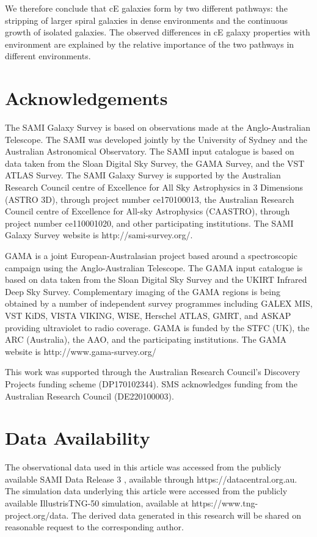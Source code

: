 \documentclass[a4paper,fleqn,usenatbib]{mnras}
\begin{document}
We therefore conclude that cE galaxies form by two different pathways: the stripping of larger spiral galaxies in dense environments and the continuous growth of isolated galaxies. The observed differences in cE galaxy properties with environment are explained by the relative importance of the two pathways in different environments. 




\section*{Acknowledgements}



The SAMI Galaxy Survey is based on observations made at the Anglo-Australian Telescope. The SAMI was developed jointly by the University of Sydney and the Australian Astronomical Observatory. The SAMI input catalogue is based on data taken from the Sloan Digital Sky Survey, the GAMA Survey, and the VST ATLAS Survey. The SAMI Galaxy Survey is supported by the Australian Research Council centre of Excellence for All Sky Astrophysics in 3 Dimensions (ASTRO 3D), through project number ce170100013, the Australian Research Council centre of Excellence for All-sky Astrophysics (CAASTRO), through project number ce110001020, and other participating institutions. The SAMI Galaxy Survey website is http://sami-survey.org/.
 
GAMA is a joint European-Australasian project based around a spectroscopic campaign using the Anglo-Australian Telescope. The GAMA input catalogue is based on data taken from the Sloan Digital Sky Survey and the UKIRT Infrared Deep Sky Survey. Complementary imaging of the GAMA regions is being obtained by a number of independent survey programmes including GALEX MIS, VST KiDS, VISTA VIKING, WISE, Herschel ATLAS, GMRT, and ASKAP providing ultraviolet to radio coverage. GAMA is funded by the STFC (UK), the ARC (Australia), the AAO, and the participating institutions. The GAMA website is http://www.gama-survey.org/
 
This work was supported through the Australian Research Council's Discovery Projects funding scheme (DP170102344). SMS acknowledges funding from the Australian Research Council (DE220100003).

\section*{Data Availability} 
The observational data used in this article was accessed from the publicly available SAMI Data Release 3 \citep{2021MNRAS.505..991C}, available through https://datacentral.org.au. The simulation data underlying this article were accessed from the publicly available IllustrisTNG-50 simulation, available at https://www.tng-project.org/data. The derived data generated in this research will be shared on reasonable request to the corresponding author.
\end{document}
